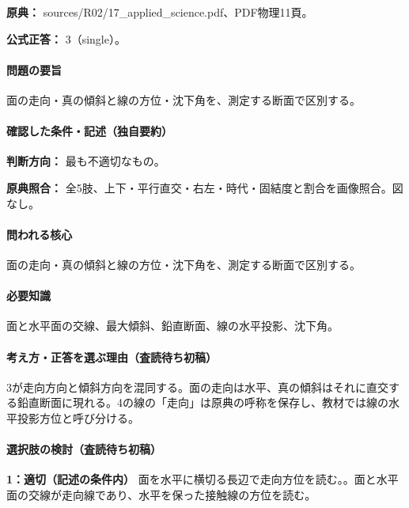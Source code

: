 \noindent\textbf{原典：} sources/R02/17\_applied\_science.pdf、PDF物理11頁。

\textbf{公式正答：} 3（single）。

\paragraph{問題の要旨} 面の走向・真の傾斜と線の方位・沈下角を、測定する断面で区別する。

\paragraph{確認した条件・記述（独自要約）}\mbox{}\par

\noindent\textbf{判断方向：} 最も不適切なもの。\par

\noindent\textbf{原典照合：} 全5肢、上下・平行直交・右左・時代・固結度と割合を画像照合。図なし。\par

\paragraph{問われる核心} 面の走向・真の傾斜と線の方位・沈下角を、測定する断面で区別する。

\paragraph{必要知識} 面と水平面の交線、最大傾斜、鉛直断面、線の水平投影、沈下角。

\paragraph{考え方・正答を選ぶ理由（査読待ち初稿）} 3が走向方向と傾斜方向を混同する。面の走向は水平、真の傾斜はそれに直交する鉛直断面に現れる。4の線の「走向」は原典の呼称を保存し、教材では線の水平投影方位と呼び分ける。

\paragraph{選択肢の検討（査読待ち初稿）}\mbox{}\par

\noindent\textbf{1：適切（記述の条件内）} 面を水平に横切る長辺で走向方位を読む。。面と水平面の交線が走向線であり、水平を保った接触線の方位を読む。\par

